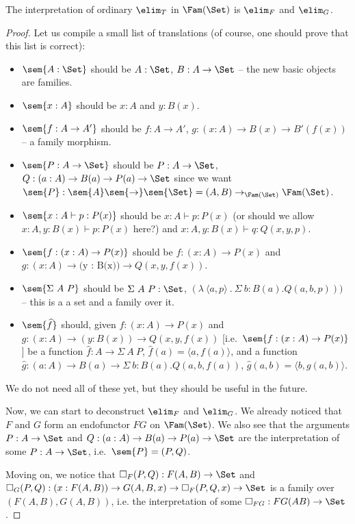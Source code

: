 \documentclass{article}
\begin{document}
\begin{problem}
  The interpretation of ordinary $\elim_T$ in $\Fam(\Set)$ is $\elim_F$ and $\elim_G$.
\end{problem}
\begin{proof}
Let us compile a small list of translations (of course, one should prove that this list is correct):

\begin{itemize}
\item $\sem{A : \Set}$ should be $A : \Set$, $B : A \to \Set$ -- the new basic objects are families.
\item $\sem{x : A}$ should be $x : A$ and $y : B(x)$.
\item $\sem{f : A \to A'}$ should be $f : A \to A'$, $g : (x : A) \to B(x) \to B'(f(x))$ -- a family morphism.
\item $\sem{P : A \to \Set}$ should be $P : A \to \Set$, $Q : (a : A) \to B(a) \to P(a) \to \Set$ since we want $\sem{P} : \sem{A} \sem{\to} \sem{\Set} = (A, B) \to_{\Fam(\Set)} \Fam(\Set)$.
\item $\sem{x : A \vdash p : P(x)}$ should be $x : A \vdash p : P(x)$ (or should we allow $x : A, y : B(x) \vdash p : P(x)$ here?) and $x : A, y : B(x) \vdash q : Q(x, y, p)$.
\item $\sem{f : (x : A) \to P(x)}$ should be $f : (x : A) \to P(x)$ and $g : (x : A) \to \mbox{(y : B(x))} \to Q(x, y, f(x))$.
\item $\sem{\Sigma\ A\ P}$ should be $\Sigma\ A\ P : \Set$, $(\lambda\ \langle a, p\rangle\ .\ \Sigma\ b\!:\!B(a).Q(a,b, p)))$ -- this is a a set and a family over it.
\item $\sem{\widehat{f}}$ should, given $f : (x : A) \to P(x)$ and $g : (x : A) \to (y : B(x)) \to Q(x, y, f(x))$ [i.e.\ $\sem{f : (x : A) \to P(x)}$]  be a function $\widehat{f} : A \to \Sigma\ A\ P$, $\widehat{f}(a) = \langle a, f(a)\rangle$, and a function $\widehat{g} : (a : A) \to B(a) \to  \Sigma\ b\!:\!B(a).Q(a,b, f(a))$, $\widehat{g}(a, b) = \langle b, g(a, b)\rangle$.
\end{itemize}
We do not need all of these yet, but they should be useful in the future.

Now, we can start to deconstruct $\elim_F$ and $\elim_G$. We already
noticed that $F$ and $G$ form an endofunctor $FG$ on $\Fam(\Set)$. We
also see that the arguments $P : A \to \Set$ and $Q : (a : A) \to B(a)
\to P(a) \to \Set$ are the interpretation of some $P : A \to \Set$,
i.e.\ $\sem{P} = (P, Q)$.

Moving on, we notice that $\square_F(P, Q) : F(A, B) \to \Set$ and
$\square_G(P, Q) : \\ (x : F(A, B)) \to G(A, B, x) \to \square_F(P, Q,
x) \to \Set$ is a family over $(F(A,B), G(A,B))$, i.e. the interpretation of some $\square_{FG} : FG(AB) \to \Set$.


\end{proof}
\end{document}

